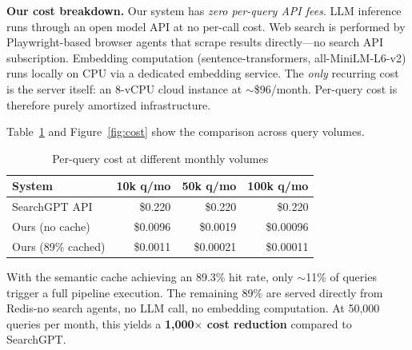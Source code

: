 \documentclass[conference]{IEEEtran}
\begin{document}
\textbf{Our cost breakdown.} Our system has \emph{zero per-query API fees}. LLM inference runs through an open model API at no per-call cost. Web search is performed by Playwright-based browser agents that scrape results directly---no search API subscription. Embedding computation (sentence-transformers, all-MiniLM-L6-v2) runs locally on CPU via a dedicated embedding service. The \emph{only} recurring cost is the server itself: an 8-vCPU cloud instance at ${\sim}$\$96/month. Per-query cost is therefore purely amortized infrastructure.

Table~\ref{tab:cost} and Figure~\ref{fig:cost} show the comparison across query volumes.

\begin{table}[h]
\centering
\caption{Per-query cost at different monthly volumes}
\label{tab:cost}
{\small
\begin{tabular}{@{}lrrr@{}}
\toprule
\textbf{System} & \textbf{10k q/mo} & \textbf{50k q/mo} & \textbf{100k q/mo} \\
\midrule
SearchGPT API & \$0.220 & \$0.220 & \$0.220 \\
Ours (no cache) & \$0.0096 & \$0.0019 & \$0.00096 \\
Ours (89\% cached) & \$0.0011 & \$0.00021 & \$0.00011 \\
\bottomrule
\end{tabular}}
\end{table}

With the semantic cache achieving an 89.3\% hit rate, only ${\sim}$11\% of queries trigger a full pipeline execution. The remaining 89\% are served directly from Redis-no search agents, no LLM call, no embedding computation. At 50{,}000 queries per month, this yields a \textbf{1{,}000$\times$ cost reduction} compared to SearchGPT.
\end{document}
